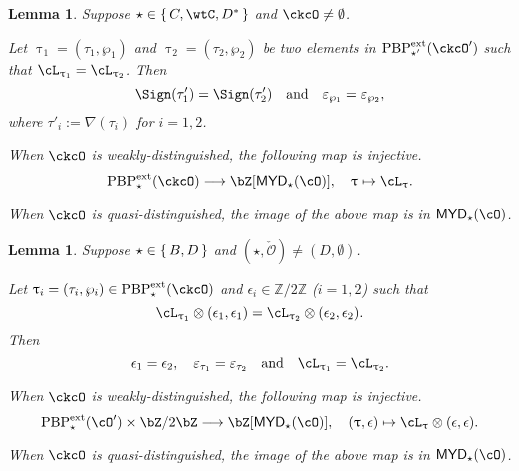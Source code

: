 \documentclass[12pt,a4paper]{amsart}
\newcommand{\AC}{\mathrm{AC}}
\def\MYD{{\mathsf{MYD}}}
\def\AND{\quad\text{and}\quad}
\def\oAC#1{\AC(#1)}
\def\AC{\mathrm{AC}}
\newcommand{\CO}{{\mathcal {O}}}
\newcommand{\Z}{\mathbb{Z}}
\def\DD{\nabla}
\numberwithin{equation}{section}
\newtheorem{lem}[thm]{Lemma}
\theoremstyle{remark}
\def\PBPe{\mathrm{PBP}^{\mathrm{ext}}}
\def\PBPes{\mathrm{PBP}^{\mathrm{ext}}_{\star}}
\def\PBPesp{\mathrm{PBP}^{\mathrm{ext}}_{\star'}}
\def\ckcOp{\ckcO^{\prime}}
\def\cOp{\cO^{\prime}}
\begin{document}
\begin{lem}\label{lem:C}
Suppose $\star \in \set{C,\wtC,D^{*}}$ and $\ckcO\neq \emptyset$.
  \begin{enuma}
    \item Let $\uptau_{1} = (\tau_{1},\wp_{1})$ and $\uptau_{2}=(\tau_{2},\wp_{2})$ be two elements in
    $\PBPesp(\ckcOp)$ such that $\ac_{\uptau_{1}} =  \ac_{\uptau_{2}}$.
    Then
    \[\Sign(\tau'_{1})=\Sign(\tau'_{2}) \quad \text{and} \quad \varepsilon_{\wp_{1}}=\varepsilon_{\wp_{2}},
    \]
    where $\tau'_{i} := \DD(\tau_{i})$ for $i=1,2$.
    \item When $\ckcO$ is weakly-distinguished, the following map is injective.
    \[
      \PBPes( \ckcO )\longrightarrow \bZ[\MYD_{\star}(\cO)],
      \quad \uptau\mapsto \ac_{\uptau}.
    \]
    \item When $\ckcO$ is quasi-distinguished, the image of the above map is in $\MYD_{\star}(\cO)$.
  \end{enuma}
\end{lem}


\begin{lem}\label{lem:BD}
Suppose $\star \in \set{B,D}$ and $(\star, \check \CO)\neq (D, \emptyset)$.
  \begin{enuma}
  \item Let $\uptau_i=(\tau_i, \wp_i)\in \PBPe_\star(\ckcO)$ and
  $\epsilon_i\in \Z/2\Z$ ($i=1,2$) such that
  \[
    \ac_{\uptau_1}\lotimes (\epsilon_{1},\epsilon_{1})= \ac_{\uptau_2}\lotimes( \epsilon_{2},\epsilon_{2} ).
  \]
  Then
  \[
    \epsilon_1=\epsilon_2,\quad \varepsilon_{\tau_1}=\varepsilon_{\tau_2} \AND \ac_{\uptau_{1}}=\ac_{\uptau_{2}}.
  \]

  \item When $\ckcO$ is weakly-distinguished, the following map is injective.
  \[
    \PBPes( \cOp )\times \bZ/2\bZ \longrightarrow \bZ[\MYD_{\star}(\cO)],\quad
    (\uptau,\epsilon) \mapsto \ac_{\uptau}\otimes (\epsilon, \epsilon).
  \]
  \item When $\ckcO$ is quasi-distinguished, the image of the above map is in $\MYD_{\star}(\cO)$.
\end{enuma}
\end{lem}
\end{document}

